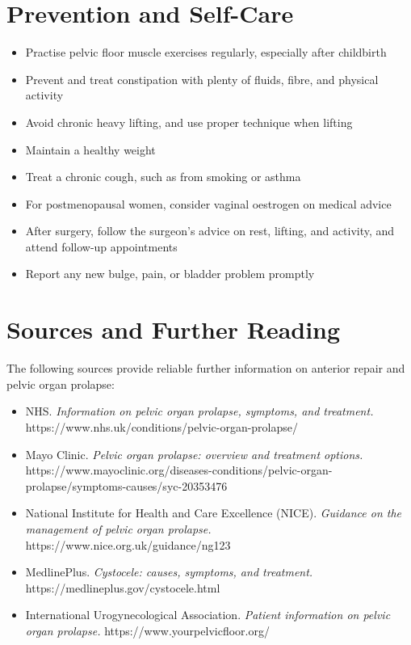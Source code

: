 \section*{Prevention and Self-Care}
\begin{itemize}
    \item Practise pelvic floor muscle exercises regularly, especially after childbirth
    \item Prevent and treat constipation with plenty of fluids, fibre, and physical activity
    \item Avoid chronic heavy lifting, and use proper technique when lifting
    \item Maintain a healthy weight
    \item Treat a chronic cough, such as from smoking or asthma
    \item For postmenopausal women, consider vaginal oestrogen on medical advice
    \item After surgery, follow the surgeon's advice on rest, lifting, and activity, and attend follow-up appointments
    \item Report any new bulge, pain, or bladder problem promptly
\end{itemize}

\section*{Sources and Further Reading}
The following sources provide reliable further information on anterior repair and pelvic organ prolapse:

\begin{itemize}
    \item NHS. \textit{Information on pelvic organ prolapse, symptoms, and treatment.} https://www.nhs.uk/conditions/pelvic-organ-prolapse/
    \item Mayo Clinic. \textit{Pelvic organ prolapse: overview and treatment options.} https://www.mayoclinic.org/diseases-conditions/pelvic-organ-prolapse/symptoms-causes/syc-20353476
    \item National Institute for Health and Care Excellence (NICE). \textit{Guidance on the management of pelvic organ prolapse.} https://www.nice.org.uk/guidance/ng123
    \item MedlinePlus. \textit{Cystocele: causes, symptoms, and treatment.} https://medlineplus.gov/cystocele.html
    \item International Urogynecological Association. \textit{Patient information on pelvic organ prolapse.} https://www.yourpelvicfloor.org/
\end{itemize}
